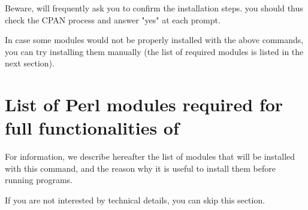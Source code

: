 \documentclass[12pt,a4paper, oneside]{scrreprt} %
\begin{document}
Beware,  will frequently ask you to confirm the
installation steps. you should thus check the CPAN process and answer
"yes" at each prompt.

In case some modules would not be properly installed with the above
commands, you can try installing them manually (the list of required
modules is listed in the next section).

\section{List of Perl modules required for full functionalities of
  \RSAT}

For information, we describe hereafter the list of modules that will
be installed with this command, and the reason why it is useful to
install them before running \RSAT programs.

If you are not interested by technical details, you can skip this
section.
\end{document}
